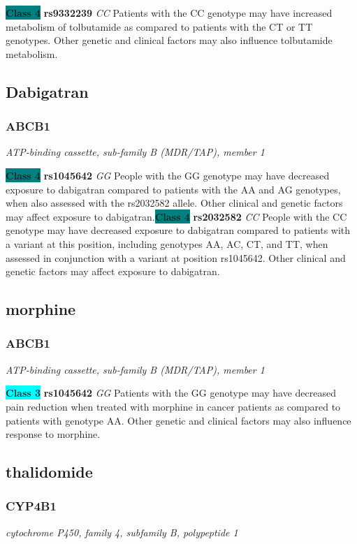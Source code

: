 \documentclass{report}
\begin{document}
\textbf{\colorbox{teal} {Class 4}} \textbf{ rs9332239 } \textit{ CC }
Patients with the CC genotype may have increased metabolism of tolbutamide as compared to patients with the CT or TT genotypes. Other genetic and clinical factors may also influence tolbutamide metabolism.\newline\subsection{ Dabigatran }\subsubsection{ ABCB1 }
\textit{ ATP-binding cassette, sub-family B (MDR/TAP), member 1 }

\textbf{\colorbox{teal} {Class 4}} \textbf{ rs1045642 } \textit{ GG }
People with the GG genotype may have decreased exposure to dabigatran compared to patients with the AA and AG genotypes, when also assessed with the rs2032582 allele. Other clinical and genetic factors may affect exposure to dabigatran.\newline\textbf{\colorbox{teal} {Class 4}} \textbf{ rs2032582 } \textit{ CC }
People with the CC genotype may have decreased exposure to dabigatran compared to patients with a variant at this position, including genotypes AA, AC, CT, and TT, when assessed in conjunction with a variant at position rs1045642. Other clinical and genetic factors may affect exposure to dabigatran. \newline\subsection{ morphine }\subsubsection{ ABCB1 }
\textit{ ATP-binding cassette, sub-family B (MDR/TAP), member 1 }

\textbf{\colorbox{cyan} {Class 3}} \textbf{ rs1045642 } \textit{ GG }
Patients with the GG genotype may have decreased pain reduction when treated with morphine in cancer patients as compared to patients with genotype AA. Other genetic and clinical factors may also influence response to morphine.\newline\subsection{ thalidomide }\subsubsection{ CYP4B1 }
\textit{ cytochrome P450, family 4, subfamily B, polypeptide 1 }
\end{document}
